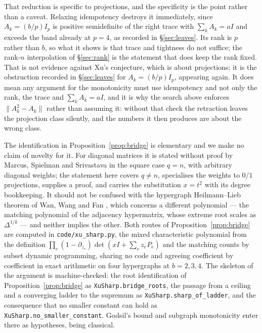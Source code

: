 \documentclass[11pt]{article}
\theoremstyle{remark}
\begin{document}
That reduction is specific to projections, and the specificity is the point rather than a
caveat. Relaxing idempotency destroys it immediately, since $A_k=(b/p)I_p$ is positive semidefinite of
the right trace with $\sum_kA_k=aI$ and exceeds the band already at $p=4$, as recorded in
\S\ref{sec:leaves}. Its rank is $p$ rather than $b$, so what it shows is that trace and tightness
do not suffice; the rank-$n$ interpolation of \S\ref{sec:rank} is the statement that does keep the
rank fixed. That is not evidence against Xu's conjecture, which is about projections; it is the
obstruction recorded in \S\ref{sec:leaves} for $A_k=(b/p)I_p$, appearing again. It does mean any
argument for the monotonicity must use idempotency and not only the rank, the trace and
$\sum_kA_k=aI$, and it is why the search above enforces $\|A_k^2-A_k\|$ rather than assuming it:
without that check the retraction leaves the projection class silently, and the numbers it then
produces are about the wrong class.

The identification in Proposition~\ref{prop:bridge} is elementary and we make no claim of novelty
for it. For diagonal matrices it is stated without proof by Marcus, Spielman and Srivastava
\cite[\S7]{MSSII} in the square case $q=n$, with arbitrary diagonal weights; the statement here
covers $q\neq n$, specialises the weights to $0/1$ projections, supplies a proof, and carries the
substitution $x=t^2$ with its degree bookkeeping.
It should not be confused with the hypergraph Heilmann--Lieb theorem of Wan, Wang and Fan
\cite{Zhang}, which concerns a different polynomial --- the matching polynomial of the adjacency
hypermatrix, whose extreme root scales as $\Delta^{1/k}$ --- and neither implies the other. Both
routes of Proposition~\ref{prop:bridge} are computed in \texttt{code/xu\_sharp.py}, the mixed
characteristic polynomial from the definition
$\prod_e(1-\partial_{z_e})\det(xI+\sum_ez_eP_e)$ and the matching counts by subset dynamic
programming, sharing no code and agreeing coefficient by coefficient in exact arithmetic on four
hypergraphs at $b=2,3,4$. The skeleton of the argument is machine-checked: the root
identification of Proposition~\ref{prop:bridge} as \texttt{XuSharp.bridge\_roots}, the passage
from a ceiling and a converging ladder to the supremum as \texttt{XuSharp.sharp\_of\_ladder},
and the consequence that no smaller constant can hold as
\texttt{XuSharp.no\_smaller\_constant}. Godsil's bound and subgraph monotonicity enter there as
hypotheses, being classical.
\end{document}
